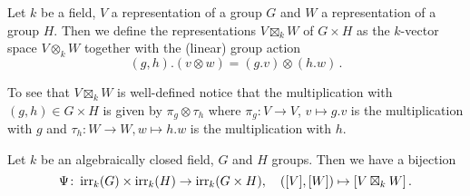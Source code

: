 \begin{definition}
  Let $k$ be a field, $V$ a representation of a group $G$ and $W$ a representation of a group $H$.
  Then we define the representations $V \boxtimes_k W$ of $G \times H$ as the $k$-vector space $V \otimes_k W$ together with the (linear) group action
  \[
      (g,h).(v \otimes w)
    = (g.v) \otimes (h.w) \,.
  \]
\end{definition}


To see that $V \boxtimes_k W$ is well-defined notice that the multiplication with $(g,h) \in G \times H$ is given by $\pi_g \otimes \tau_h$ where $\pi_g \colon V \to V$, $v \mapsto g.v$ is the multiplication with $g$ and $\tau_h \colon W \to W, w \mapsto h.w$ is the multiplication with $h$.


\begin{theorem}
  Let $k$ be an algebraically closed field, $G$ and $H$ groups.
  Then we have a bijection
  \[
            \Psi
    \colon  \operatorname{irr}_k(G) \times \operatorname{irr}_k(H)
    \to     \operatorname{irr}_k(G \times H),
    \quad   ([V],[W])
    \mapsto [V \boxtimes_k W] \,.
  \]
\end{theorem}
